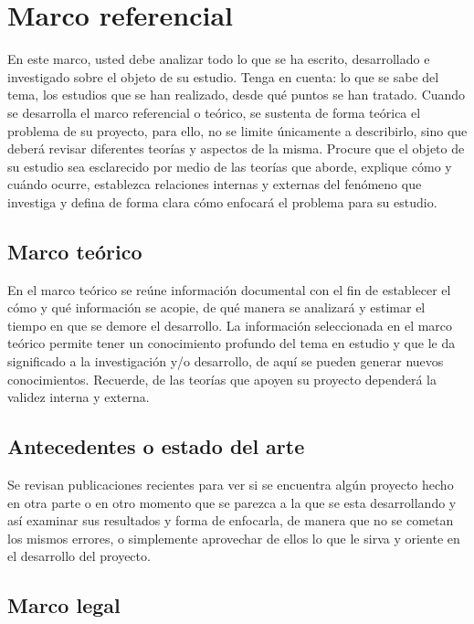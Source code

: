 \chapter{Marco referencial}

En este marco, usted debe analizar todo lo que se ha escrito, desarrollado e
investigado sobre el objeto de su estudio.
Tenga en cuenta: lo que se sabe del tema, los estudios que se han realizado,
desde qué puntos se han tratado. Cuando se desarrolla el marco referencial o
teórico, se sustenta de forma teórica el problema de su proyecto, para ello, no
se limite únicamente a describirlo, sino que deberá revisar diferentes teorías y
aspectos de la misma. Procure que el objeto de su estudio sea esclarecido por
medio de las teorías que aborde, explique cómo y cuándo ocurre, establezca
relaciones internas y externas del fenómeno que investiga y defina de forma
clara cómo enfocará el problema para su estudio.

\section{Marco teórico}

En el marco teórico se reúne información documental con el fin de establecer
el cómo y qué información se acopie, de qué manera se analizará y estimar el
tiempo en que se demore el desarrollo.
La información seleccionada en el marco teórico permite tener un
conocimiento profundo del tema en estudio y que le da significado a la
investigación y/o desarrollo, de aquí se pueden generar nuevos conocimientos.
Recuerde, de las teorías que apoyen su proyecto dependerá la validez interna
y externa.

\section{Antecedentes o estado del arte}

Se revisan publicaciones recientes para ver si se encuentra algún proyecto
hecho en otra parte o en otro momento que se parezca a la que se esta
desarrollando y así examinar sus resultados y forma de enfocarla, de manera
que no se cometan los mismos errores, o simplemente aprovechar de ellos lo
que le sirva y oriente en el desarrollo del proyecto.

\section{Marco legal}
\lipsum[1]

